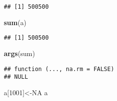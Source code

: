 \documentclass[]{article}
\newenvironment{Shaded}{\begin{snugshade}}{\end{snugshade}}
\newcommand{\KeywordTok}[1]{\textcolor[rgb]{0.13,0.29,0.53}{\textbf{#1}}}
\newcommand{\DecValTok}[1]{\textcolor[rgb]{0.00,0.00,0.81}{#1}}
\newcommand{\OtherTok}[1]{\textcolor[rgb]{0.56,0.35,0.01}{#1}}
\newcommand{\NormalTok}[1]{#1}
\begin{document}
\begin{verbatim}
## [1] 500500
\end{verbatim}

\begin{Shaded}
\begin{Highlighting}[]
\KeywordTok{sum}\NormalTok{(a)}
\end{Highlighting}
\end{Shaded}

\begin{verbatim}
## [1] 500500
\end{verbatim}

\begin{Shaded}
\begin{Highlighting}[]
\KeywordTok{args}\NormalTok{(sum)}
\end{Highlighting}
\end{Shaded}

\begin{verbatim}
## function (..., na.rm = FALSE) 
## NULL
\end{verbatim}

\begin{Shaded}
\begin{Highlighting}[]
\NormalTok{a[}\DecValTok{1001}\NormalTok{]<-}\OtherTok{NA}
\NormalTok{a}
\end{Highlighting}
\end{Shaded}
\end{document}
